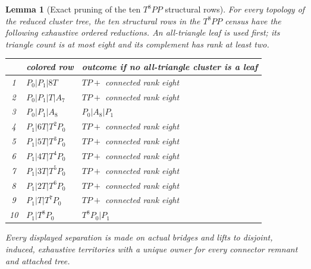 \documentclass[11pt]{article}
\newtheorem{lemma}[theorem]{Lemma}
\begin{document}
\begin{lemma}[Exact pruning of the ten $T^8PP$ structural rows]
\label{lem:t8ppprune}
For every topology of the reduced cluster tree, the ten structural rows in
the $T^8PP$ census have the following exhaustive ordered reductions.  An
all-triangle leaf is used first; its triangle count is at most eight and its
complement has rank at least two.
\begin{center}
\small
\begin{tabular}{cll}
\toprule
&colored row&outcome if no all-triangle cluster is a leaf\\
\midrule
1&$P_0|P_1|8T$&$TP+$ connected rank eight\\
2&$P_0|P_1|T|A_7$&$TP+$ connected rank eight\\
3&$P_0|P_1|A_8$&$P_0|A_8|P_1$\\
4&$P_1|6T|T^2P_0$&$TP+$ connected rank eight\\
5&$P_1|5T|T^3P_0$&$TP+$ connected rank eight\\
6&$P_1|4T|T^4P_0$&$TP+$ connected rank eight\\
7&$P_1|3T|T^5P_0$&$TP+$ connected rank eight\\
8&$P_1|2T|T^6P_0$&$TP+$ connected rank eight\\
9&$P_1|T|T^7P_0$&$TP+$ connected rank eight\\
10&$P_1|T^8P_0$&$T^8P_0|P_1$\\
\bottomrule
\end{tabular}
\end{center}
Every displayed separation is made on actual bridges and lifts to disjoint,
induced, exhaustive territories with a unique owner for every connector
remnant and attached tree.
\end{lemma}
\end{document}
